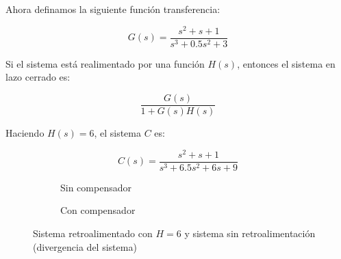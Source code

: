 \documentclass[twoside]{article}
\begin{document}
Ahora definamos la siguiente función transferencia:

\begin{equation}
    G(s) = \frac{s^2 + s + 1}{s^3 + 0.5s^2 + 3}
\end{equation}



\noindent Si el sistema está realimentado por una función $H(s)$, entonces el sistema en lazo cerrado es:

\begin{equation}
    \frac{G(s)}{ 1 + G(s)H(s)}
\end{equation}


\noindent Haciendo $H(s) = 6$, el sistema $C$ es:

\begin{equation}
    C(s) = \frac{s^2 + s + 1}{s^3 + 6.5s^2 + 6s + 9}
\end{equation}


\begin{figure}[ht!]
    \centering %
    \begin{subfigure}{0.49\textwidth}
        \centering %
        \centering
        \caption{Sin compensador}
    \end{subfigure}
    \hfill
    \begin{subfigure}{0.49\textwidth}
        \centering %
        \caption{Con compensador}
    \end{subfigure}
    \caption{Sistema retroalimentado con $H = 6$ y sistema sin retroalimentación (divergencia del sistema)}
\end{figure}
\end{document}
